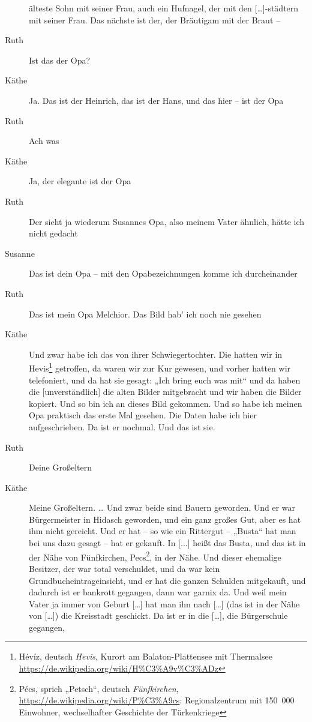 \documentclass[ngerman,]{article}
\begin{document}
\begin{multicols}{2}
\begin{description}
älteste Sohn mit seiner Frau, auch ein Hufnagel, der mit den
{[}\ldots{}{]}-städtern mit seiner Frau. Das nächste ist der, der
Bräutigam mit der Braut –
\item[Ruth]
Ist das der Opa?
\item[Käthe]
Ja. Das ist der Heinrich, das ist der Hans, und das hier – ist der Opa
\item[Ruth]
Ach was
\item[Käthe]
Ja, der elegante ist der Opa
\item[Ruth]
Der sieht ja wiederum Susannes Opa, also meinem Vater ähnlich, hätte ich
nicht gedacht
\item[Susanne]
Das ist dein Opa – mit den Opabezeichnungen komme ich durcheinander
\item[Ruth]
Das ist mein Opa Melchior. Das Bild hab' ich noch nie gesehen
\item[Käthe]
Und zwar habe ich das von ihrer Schwiegertochter. Die hatten wir in
Hevis\footnote{Hévíz, deutsch \emph{Hevis}, Kurort am Balaton-Plattensee
  mit Thermalsee \url{https://de.wikipedia.org/wiki/H\%C3\%A9v\%C3\%ADz}}
getroffen, da waren wir zur Kur gewesen, und vorher hatten wir
telefoniert, und da hat sie gesagt: „Ich bring euch was mit“ und da
haben die {[}unverständlich{]} die alten Bilder mitgebracht und wir
haben die Bilder kopiert. Und so bin ich an dieses Bild gekommen. Und so
habe ich meinen Opa praktisch das erste Mal gesehen. Die Daten habe ich
hier aufgeschrieben. Da ist er nochmal. Und das ist sie.
\item[Ruth]
Deine Großeltern
\item[Käthe]
Meine Großeltern. \ldots{} Und zwar beide sind Bauern geworden. Und er
war Bürgermeister in Hidasch geworden, und ein ganz großes Gut, aber es
hat ihm nicht gereicht. Und er hat – so wie ein Rittergut – „Busta“ hat
man bei uns dazu gesagt – hat er gekauft. In {[}...{]} heißt das Busta,
und das ist in der Nähe von Fünfkirchen, Pecs\footnote{Pécs, sprich
  „Petsch“, deutsch \emph{Fünfkirchen},
  \url{https://de.wikipedia.org/wiki/P\%C3\%A9cs}: Regionalzentrum mit
  150~000 Einwohner, wechselhafter Geschichte der Türkenkriege}, in der
Nähe. Und dieser ehemalige Besitzer, der war total verschuldet, und da
war kein Grundbucheintrageinsicht, und er hat die ganzen Schulden
mitgekauft, und dadurch ist er bankrott gegangen, dann war garnix da.
Und weil mein Vater ja immer von Geburt {[}\ldots{}{]} hat man ihn nach
{[}\ldots{}{]} (das ist in der Nähe von {[}\ldots{}{]}) die Kreisstadt
geschickt. Da ist er in die {[}\ldots{}{]}, die Bürgerschule gegangen,

\end{description}
\end{multicols}
\end{document}
